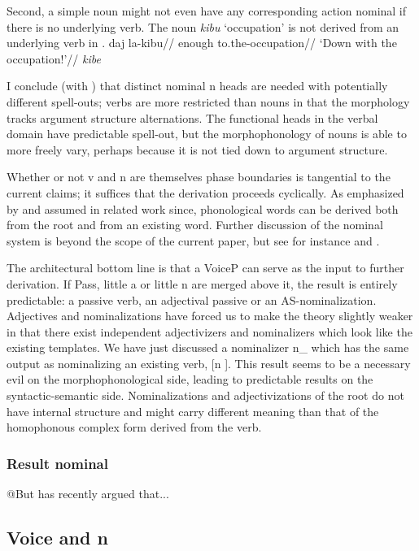 Second, a simple noun might not even have any corresponding action nominal if there is no underlying verb. The noun \emph{kibu} `occupation' is not derived from an underlying verb in {\tpie}. 
\pex
	\a \begingl
		\gla daj la-kibu//
		\glb enough to.the-occupation//
		\glft `Down with the occupation!'//
	\endgl	
	\a \ljudge{*} \emph{kibe}
\xe

I conclude (with \citealt{arad03}) that distinct nominal n heads are needed with potentially different spell-outs; verbs are more restricted than nouns in that the morphology tracks argument structure alternations. The functional heads in the verbal domain have predictable spell-out, but the morphophonology of nouns is able to more freely vary, perhaps because it is not tied down to argument structure.

Whether or not v and n are themselves phase boundaries is tangential to the current claims; it suffices that the derivation proceeds cyclically. As emphasized by \cite{arad03,arad05} and assumed in related work since, phonological words can be derived both from the root and from an existing word. Further discussion of the nominal system is beyond the scope of the current paper, but see for instance \cite{fausthever10} and \cite{laks15ws}.


The architectural bottom line is that a VoiceP can serve as the input to further derivation. If Pass, little a or little n are merged above it, the result is entirely predictable: a passive verb, an adjectival passive or an AS-nominalization. Adjectives and nominalizations have forced us to make the theory slightly weaker in that there exist independent adjectivizers and nominalizers which look like the existing templates. We have just discussed a nominalizer n_{} which has the same output as nominalizing an existing verb, [n \tpie]. This result seems to be a necessary evil on the morphophonological side, leading to predictable results on the syntactic-semantic side. Nominalizations and adjectivizations of the root do not have internal structure and might carry different meaning than that of the homophonous complex form derived from the verb.

		\subsubsection{Result nominal}
@But \cite{ahdout19phd} has recently argued that...

	
	\subsection{Voice and n}


